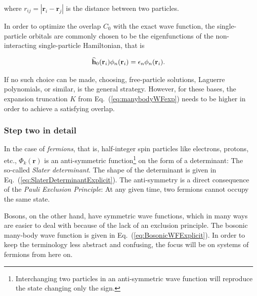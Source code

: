 where $r_{ij} = |\mathbf{r}_i - \mathbf{r}_j|$ is the distance between two particles.

In order to optimize the overlap $C_0$ with the exact wave function, the single-particle orbitals are commonly chosen to be the eigenfunctions of the non-interacting single-particle Hamiltonian, that is

\begin{equation}
\label{eq:orbitalEigenEq}
 {\bf\widehat{h}}_0(\mathbf{r}_i)\phi_n(\mathbf{r}_i) = \epsilon_n\phi_n(\mathbf{r}_i).
\end{equation}

If no such choice can be made, choosing, free-particle solutions, Laguerre polynomials, or similar, is the general strategy. However, for these bases, the expansion truncation $K$ from Eq.~(\ref{eq:manybodyWFexp}) needs to be higher in order to achieve a satisfying overlap.  


\subsubsection{Step two in detail}

In the case of \textit{fermions}, that is, half-integer spin particles like electrons, protons, etc., $\Phi_k(\mathbf{r})$ is an anti-symmetric function\footnote{Interchanging two particles in an anti-symmetric wave function will reproduce the state changing only the sign.} on the form of a determinant: The so-called \textit{Slater determinant}. The shape of the determinant is given in Eq.~(\ref{eq:SlaterDeterminantExplicit}). The anti-symmetry is a direct consequence of the \textit{Pauli Exclusion Principle}: At any given time, two fermions cannot occupy the same state. 

Bosons, on the other hand, have symmetric wave functions, which in many ways are easier to deal with because of the lack of an exclusion principle. The bosonic many-body wave function is given in Eq.~(\ref{eq:BosonicWFExplicit}). In order to keep the terminology less abstract and confusing, the focus will be on systems of fermions from here on.

